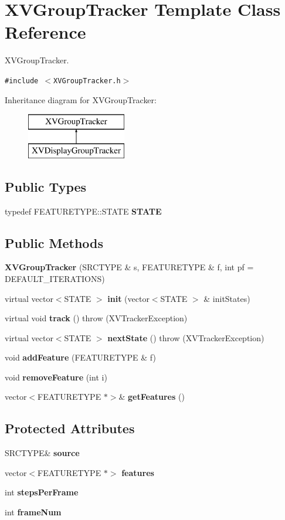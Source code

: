 \hypertarget{class_XVGroupTracker}{
\section{XVGroup\-Tracker  Template Class Reference}
\label{XVGroupTracker}
}
XVGroup\-Tracker. 


{\tt \#include $<$XVGroup\-Tracker.h$>$}

Inheritance diagram for XVGroup\-Tracker:\begin{figure}[H]
\begin{center}
\leavevmode
\includegraphics[height=2cm]{class_XVGroupTracker}
\end{center}
\end{figure}
\subsection*{Public Types}
\begin{CompactItemize}
\item 
typedef FEATURETYPE::STATE {\bf STATE}
\end{CompactItemize}
\subsection*{Public Methods}
\begin{CompactItemize}
\item 
{\bf XVGroup\-Tracker} (SRCTYPE \& s, FEATURETYPE \& f, int pf = DEFAULT\_\-ITERATIONS)
\item 
virtual vector$<$STATE $>$ {\bf init} (vector$<$STATE $>$ \& init\-States)
\item 
virtual void {\bf track} ()  throw (XVTracker\-Exception)
\item 
virtual vector$<$STATE $>$ {\bf next\-State} ()  throw (XVTracker\-Exception)
\item 
void {\bf add\-Feature} (FEATURETYPE \& f)
\item 
void {\bf remove\-Feature} (int i)
\item 
vector$<$FEATURETYPE $\ast$$>$\& {\bf get\-Features} ()
\end{CompactItemize}
\subsection*{Protected Attributes}
\begin{CompactItemize}
\item 
SRCTYPE\& {\bf source}
\item 
vector$<$FEATURETYPE $\ast$$>$ {\bf features}
\item 
int {\bf steps\-Per\-Frame}
\item 
int {\bf frame\-Num}
\end{CompactItemize}


